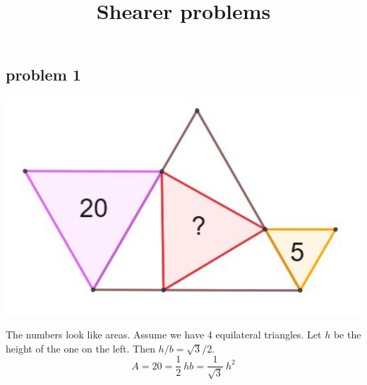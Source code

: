 \documentclass[11pt, oneside]{article}
\title{Shearer problems}
\date{}
\begin{document}
\maketitle
\Large
\subsection*{problem 1}
 \begin{center} \includegraphics [scale=0.3] {Shearer1.png} \end{center}
The numbers look like areas.  Assume we have 4 equilateral triangles. Let $h$ be the height of the one on the left.  Then $h/b = \sqrt{3}/2$.
\[ A = 20 = \frac{1}{2} \ hb = \frac{1}{\sqrt{3}} \ h^2 \]
\end{document}
